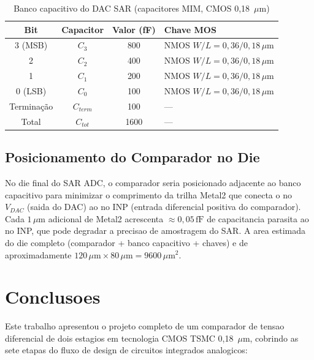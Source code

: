 \documentclass[12pt, a4paper]{article}
\begin{document}
\begin{table}[H]
\centering
\caption{Banco capacitivo do DAC SAR (capacitores MIM, CMOS 0{,}18~$\mu$m)}
\label{tab:dac_caps}
\begin{tabular}{cccl}
\toprule
\textbf{Bit} & \textbf{Capacitor} & \textbf{Valor (fF)} & \textbf{Chave MOS} \\
\midrule
3 (MSB) & $C_3$ & 800  & NMOS $W/L = 0{,}36/0{,}18\,\mu\text{m}$ \\
2       & $C_2$ & 400  & NMOS $W/L = 0{,}36/0{,}18\,\mu\text{m}$ \\
1       & $C_1$ & 200  & NMOS $W/L = 0{,}36/0{,}18\,\mu\text{m}$ \\
0 (LSB) & $C_0$ & 100  & NMOS $W/L = 0{,}36/0{,}18\,\mu\text{m}$ \\
Terminação & $C_{term}$ & 100 & --- \\
\midrule
Total   & $C_{tot}$ & 1600 & --- \\
\bottomrule
\end{tabular}
\end{table}

\subsection{Posicionamento do Comparador no Die}

No die final do SAR ADC, o comparador seria posicionado adjacente ao banco
capacitivo para minimizar o comprimento da trilha Metal2 que conecta o no
$V_{DAC}$ (saida do DAC) ao no INP (entrada diferencial positiva do comparador).
Cada $1\,\mu\text{m}$ adicional de Metal2 acrescenta $\approx 0{,}05\,\text{fF}$
de capacitancia parasita ao no INP, que pode degradar a precisao de
amostragem do SAR. A area estimada do die completo (comparador + banco capacitivo
+ chaves) e de aproximadamente $120\,\mu\text{m} \times 80\,\mu\text{m} =
9600\,\mu\text{m}^2$.

\section{Conclusoes}

Este trabalho apresentou o projeto completo de um comparador de tensao diferencial
de dois estagios em tecnologia CMOS TSMC 0{,}18~$\mu$m, cobrindo as sete etapas
do fluxo de design de circuitos integrados analogicos:
\end{document}
